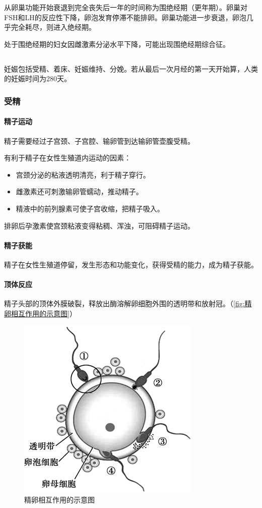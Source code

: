 从卵巢功能开始衰退到完全丧失后一年的时间称为围绝经期（更年期）。卵巢对FSH和LH的反应性下降，卵泡发育停滞不能排卵。卵巢功能进一步衰退，卵泡几乎完全耗尽，则进入绝经期。

处于围绝经期的妇女因雌激素分泌水平下降，可能出现围绝经期综合征。

\subsection[妊娠]{}

妊娠包括受精、着床、妊娠维持、分娩。若从最后一次月经的第一天开始算，人类的妊娠时间为280天。

\subsubsection{受精}

\paragraph{精子运动}

精子需要经过子宫颈、子宫腔、输卵管到达输卵管壶腹受精。

有利于精子在女性生殖道内运动的因素：
\begin{itemize}
	\item 宫颈分泌的粘液透明清亮，利于精子穿行。
	\item 雌激素还可刺激输卵管蠕动，推动精子。
	\item 精液中的前列腺素可使子宫收缩，把精子吸入。
\end{itemize}

排卵后孕激素使宫颈粘液变得粘稠、浑浊，可阻碍精子运动。

\paragraph{精子获能}

精子在女性生殖道停留，发生形态和功能变化，获得受精的能力，成为精子获能。

\paragraph{顶体反应}

精子头部的顶体外膜破裂，释放出酶溶解卵细胞外围的透明带和放射冠。（\autoref{fig:精卵相互作用的示意图}）

\begin{figure}[htbp]
	\centering
	\includegraphics[width=0.3\linewidth]{Pics/精卵相互作用的示意图}
	\caption{精卵相互作用的示意图}
	\label{fig:精卵相互作用的示意图}
\end{figure}


